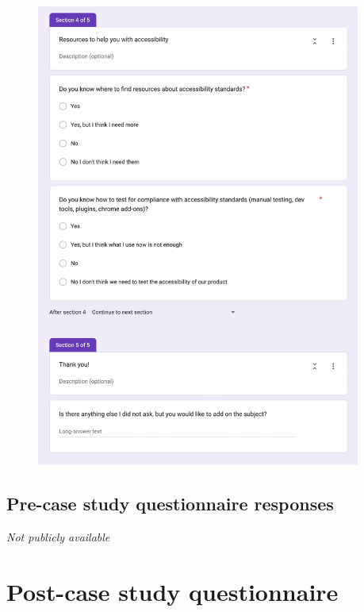 \documentclass{master_thesis}
\begin{document}
\begin{figure}[H]
	\centering
	\includegraphics[width=0.95\textwidth]{img/surveys/pre-survey-3.png}
\end{figure}
\clearpage

\subsection{Pre-case study questionnaire responses}\label{appendix:pre-survey-responses}
\textit{Not publicly available}

\section{Post-case study questionnaire }\label{appendix:post-survey}
\end{document}
